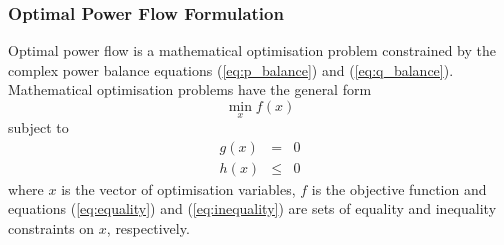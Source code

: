 
\subsubsection{Optimal Power Flow Formulation}
Optimal power flow is a mathematical optimisation problem constrained by the
complex power balance equations (\ref{eq:p_balance}) and (\ref{eq:q_balance}).
Mathematical optimisation problems have the general form
\begin{equation}
\min_x f(x)
\end{equation}
subject to
\begin{eqnarray}
\label{eq:equality}
g(x)& =& 0\\
\label{eq:inequality}
h(x)& \leq& 0
\end{eqnarray}
where $x$ is the vector of optimisation variables, $f$ is the objective
function and equations (\ref{eq:equality}) and (\ref{eq:inequality}) are sets
of equality and inequality constraints on $x$, respectively.

